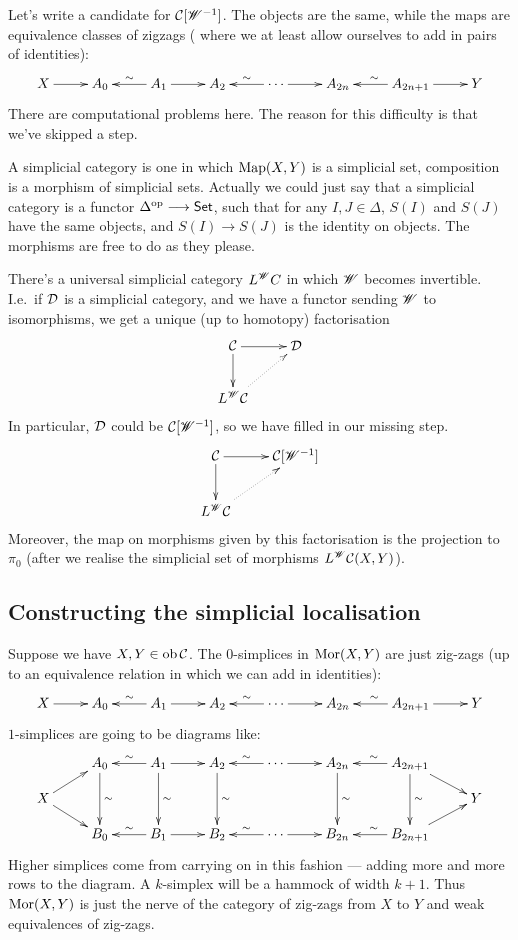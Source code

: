 \documentclass[11pt]{article}
\begin{document}
\begin{SaulSimplicialLocalisation}
Let's write a candidate for $\mathcal{C}[\mathscr{W}^{-1}]$. The objects are the same, while the maps are equivalence classes of zigzags ( where we at least allow ourselves to add in pairs of identities):
\[\xymatrix{
X\ar[r]&A_0&\ar[l]_\sim A_1\ar[r]&A_2&\ar[l]_\sim\cdots\ar[r]&A_{2n}&A_{2n+1}\ar[l]_\sim\ar[r]&Y
}\]
There are computational problems here. The reason for this difficulty is that we've skipped a step.
\begin{defn*}
A simplicial category is one in which $\operatorname{Map}(X,Y)$ is a simplicial set, composition is a morphism of simplicial sets. Actually we could just say that a simplicial category is a functor $\Delta^{\textup{op}}\longrightarrow\operatorname{{\mathsf{Set}}}$, such that for any $I,J\in\Delta$, $S(I)$ and $S(J)$ have the same objects, and $S(I)\to S(J)$ is the identity on objects. The morphisms are free to do as they please.
\end{defn*}
There's a universal simplicial category $L^{\mathscr{W}} C$ in which $\mathscr{W}$ becomes invertible. I.e.\ if $\mathcal{D}$ is a simplicial category, and we have a functor sending $\mathscr{W}$ to isomorphisms, we get a unique (up to homotopy) factorisation
\[\xymatrix{
\ar[d]\calC\ar[r]&\calD\\
L^\scrW \calC\ar@{..>}[ur]
}\]
In particular, $\mathcal{D}$ could be $\mathcal{C}[\mathscr{W}^{-1}]$, so we have filled in our missing step.
\[\xymatrix{
\ar[d]\calC\ar[r]&\calC[\scrW^{-1}]\\
L^\scrW \calC\ar@{..>}[ur]
}\]
Moreover, the map on morphisms given by this factorisation is the projection to $\pi_0$ (after we realise the simplicial set of morphisms $L^{\mathscr{W}} \mathcal{C}(X,Y)$).
\subsection*{Constructing the simplicial localisation}
Suppose we have $X,Y\in\textup{ob}\,\mathcal{C}$. The $0$-simplices in $\operatorname{Mor}(X,Y)$ are just zig-zags (up to an equivalence relation in which we can add in identities):
\[\xymatrix{
X\ar[r]&A_0&\ar[l]_\sim A_1\ar[r]&A_2&\ar[l]_\sim\cdots\ar[r]&A_{2n}&A_{2n+1}\ar[l]_\sim\ar[r]&Y
}\]
$1$-simplices are going to be diagrams like:
\[\xymatrix@R=.4cm{
&A_0\ar[dd]^\sim&\ar[l]_\sim A_1\ar[dd]^\sim\ar[r]&A_2\ar[dd]^\sim&\ar[l]_\sim\cdots\ar[r]&A_{2n}\ar[dd]^\sim &A_{2n+1}\ar[dd]^\sim\ar[l]_\sim\ar[rd]\\
X\ar[rd]\ar[ur]&&&&&&&Y\\
&B_0&\ar[l]_\sim B_1\ar[r]&B_2&\ar[l]_\sim\cdots\ar[r]&B_{2n}&B_{2n+1}\ar[l]_\sim\ar[ru]
}\]
Higher simplices come from carrying on in this fashion --- adding more and more rows to the diagram. A $k$-simplex will be a hammock of width $k+1$.
Thus $\operatorname{Mor}(X,Y)$ is just the nerve of the category of zig-zags from $X$ to $Y$ and weak equivalences of zig-zags.


\end{SaulSimplicialLocalisation}
\end{document}
